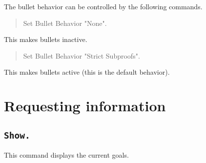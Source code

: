 The bullet behavior can be controlled by the following commands.

\begin{quote}
Set Bullet Behavior "None".
\end{quote}

This makes bullets inactive.

\begin{quote}
Set Bullet Behavior "Strict Subproofs".
\end{quote}

This makes bullets active (this is the default behavior).

\section{Requesting information}

\subsection[\tt Show.]{\tt Show.\label{Show}}
This command displays the current goals.


